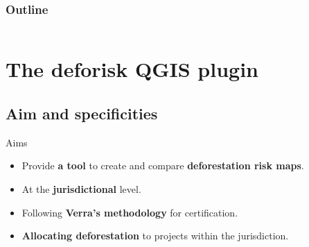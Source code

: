 \documentclass[10pt,table,dvipsnames,compress]{beamer}
\newif\ifplacelogo %
\begin{document}

\placelogotrue
\begin{frame}
  \frametitle{Outline}
  \begin{columns}[c]
    \begin{column}{0.5\textwidth}
      \tableofcontents[sections=1]
      \vspace{0.5cm}
      \tableofcontents[sections=2]
      \vspace{0.5cm}
      \tableofcontents[sections=3]
    \end{column}
    \begin{column}{0.5\textwidth}
        \tableofcontents[sections=4]
        \vspace{0.5cm}
        \tableofcontents[sections=5]
    \end{column}
  \end{columns}
\end{frame}
\placelogofalse

\section{The deforisk QGIS plugin}
\label{sec:org9850c0d}

\subsection{Aim and specificities}
\label{sec:orgf11df72}

\begin{frame}[label={sec:org5ba602a}]{Aims}
\begin{itemize}
\item Provide \textbf{a tool} to create and compare \textbf{deforestation risk maps}.
\item At the \textbf{jurisdictional} level.
\item Following \textbf{Verra's methodology} for certification.
\item \textbf{Allocating deforestation} to projects within the jurisdiction.
\end{itemize}
\end{frame}
\end{document}
